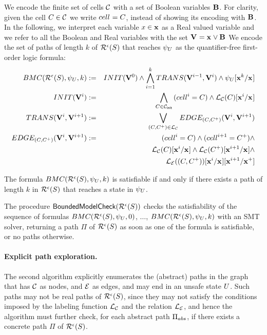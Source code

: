 We encode the finite set of cells $\mathcal{C}$ with a set of Boolean
variables ${\mathbf{B}}^{}$. For clarity, given the cell $C \in \mathcal{C}$ we
write ${cell}^{} = C$, instead of showing its encoding with ${\mathbf{B}}^{}$.
%
In the following, we interpret each variable $x \in \mathbf{x}$ as a Real
valued variable and we refer to all the Boolean and Real variables
with the set ${\mathbf{V}}^{} = {\mathbf{x}}^{} \vee {\mathbf{B}}^{}$
%
We encode the set of paths of length $k$ of
$\mathcal{R}^{\epsilon}(S)$ that reaches ${\psi}_{U}$
as the quantifier-free first-order logic formula:
\begin{eqnarray*}
BMC(\mathcal{R}^{\epsilon}(S), {\psi}_{U}, k) & := &
INIT({\mathbf{V}}^{0}) \wedge
\bigwedge_{i=1}^{k}{TRANS({\mathbf{V}}^{i-1}, {\mathbf{V}}^{i})} \wedge
{\ensuremath{{\psi}_{U}}}[{{\mathbf{x}}^{k}}/{{\mathbf{x}}^{}}]\\
INIT({\mathbf{V}}^{i}) & := &
\bigwedge_{C \in \mathcal{C}_{\mathsf{init}}}{({cell}^{i} = C) \wedge
{\ensuremath \mathcal{L}_\ensuremath \mathcal{C}(C)}[{{\mathbf{x}}^{i}}/{{\mathbf{x}}^{}}]
}
\\
TRANS({\mathbf{V}}^{i}, {\mathbf{V}}^{i+1}) & := &
  \bigvee_{(C,C^+) \in \mathcal{L}_\mathcal{C}}{
    EDGE_{(C,C^+)}({\mathbf{V}}^{i}, {\mathbf{V}}^{i+1})
  } \\
EDGE_{(C,C^+)}({\mathbf{V}}^{i}, {\mathbf{V}}^{i+1}) & := &
({cell}^{i} = C) \wedge ({cell}^{i+1} = C^+) \wedge  \\
&& {\mathcal{L}_\mathcal{C}(C)}[{{\mathbf{x}}^{i}}/{{\mathbf{x}}^{}}] \wedge
   {\ensuremath \mathcal{L}_\ensuremath \mathcal{C}(C^+)}[{{\mathbf{x}}^{i+1}}/{{\mathbf{x}}^{}}] \wedge \\
&& {{\mathcal{L}_\mathcal{E}((C,C^+))}[{{\mathbf{x}}^{i}}/{{\mathbf{x}}^{}}]}[{{\mathbf{x}}^{i+1}}/{{{\mathbf{x}}^{+}}}]
\end{eqnarray*}

The formula
$BMC(\mathcal{R}^{\epsilon}(S), {\psi}_{U}, k)$ is satisfiable
if and only if there exists a path of length $k$ in
$\mathcal{R}^{\epsilon}(S)$ that reaches a state in ${\psi}_{U}$.

The procedure
$\mathsf{BoundedModelCheck}(\mathcal{R}^{\epsilon}(S))$
checks the satisfiability of the sequence of formulas
$BMC(\mathcal{R}^{\epsilon}(S), {\psi}_{U}, 0)$,
$\ldots$,
$BMC(\mathcal{R}^{\epsilon}(S), {\psi}_{U}, k)$
with an SMT solver, returning a path $\Pi$ of
$\mathcal{R}^{\epsilon}(S)$ as soon as one of the formula is
satisfiable, or no paths otherwise.

\paragraph{Explicit path exploration.}
The second algorithm explicitly enumerates
the (abstract) paths in the graph that has $\mathcal{C}$
as nodes, and $\mathcal{E}$ as edges, and may end in an unsafe state
$U$.
%
Such paths may not be real paths of
$\mathcal{R}^{\epsilon}(S)$, since they may not satisfy the
conditions imposed by the labeling function $\mathcal{L}_\mathcal{C}$
and the relation $\mathcal{L}_\mathcal{E}$, and hence the algorithm must
further check, for each abstract path $\Pi_{abs}$, if there exists a
concrete path $\Pi$ of
$\mathcal{R}^{\epsilon}(S)$.

